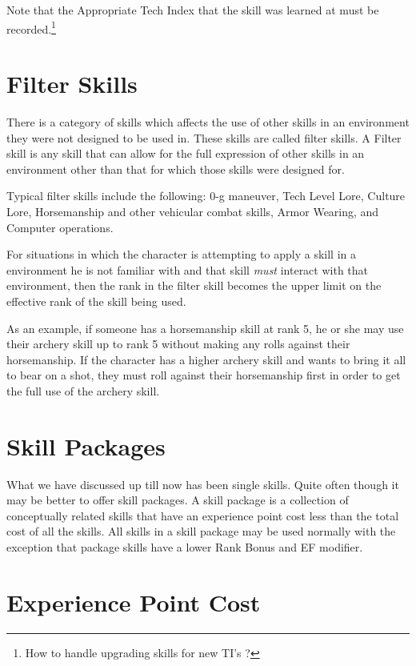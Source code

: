 Note that the Appropriate Tech Index that the skill was learned at 
must be recorded.\footnote{ How to handle upgrading skills for new TI's ?}

\section{Filter Skills}

There is a category of skills which affects the use of other skills 
in an environment they were not designed to be used in. These skills 
are called filter skills. A Filter skill is any skill that can allow 
for the full expression of other skills in an environment other than 
that for which those skills were designed for.

Typical filter skills include the following: 0-g maneuver, Tech 
Level Lore, Culture Lore, Horsemanship and other vehicular combat 
skills, Armor Wearing, and Computer operations.

For situations in which the character is attempting to apply a skill 
in a environment he is not familiar with and that skill {\em must }
interact with that environment, then the rank in the filter skill 
becomes the upper limit on the effective rank of the skill being 
used.

As an example, if someone has a horsemanship skill at rank 5, he or she
may use their archery skill up to rank 5 without making any rolls
against their horsemanship. If the character has a higher archery skill
and wants to bring it all to bear on a shot, they must roll against
their horsemanship first in order to get the full use of the archery
skill.
 
\section{Skill Packages}

What we have discussed up till now has been single skills.
Quite often though it may be better to offer skill packages.
A skill package is a collection of conceptually related 
skills that have an experience point cost less than the total 
cost of all the skills. All skills in a skill package may be 
used normally with the exception that package skills have a lower
Rank Bonus and EF modifier.

\section{Experience Point Cost}

